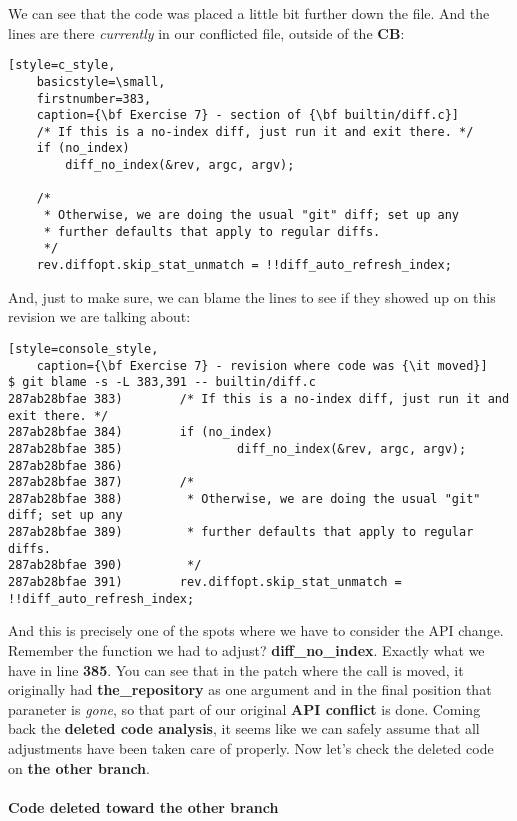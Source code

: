 We can see that the code was placed a little bit further down the file. And the lines are there {\it currently}
in our conflicted file, outside of the {\bf CB}:

\begin{lstlisting}[style=c_style,
	basicstyle=\small,
	firstnumber=383,
	caption={\bf Exercise 7} - section of {\bf builtin/diff.c}]
	/* If this is a no-index diff, just run it and exit there. */
	if (no_index)
		diff_no_index(&rev, argc, argv);

	/*
	 * Otherwise, we are doing the usual "git" diff; set up any
	 * further defaults that apply to regular diffs.
	 */
	rev.diffopt.skip_stat_unmatch = !!diff_auto_refresh_index;
\end{lstlisting}

And, just to make sure, we can blame the lines to see if they showed up on this revision we are talking about:

\begin{lstlisting}[style=console_style,
	caption={\bf Exercise 7} - revision where code was {\it moved}]
$ git blame -s -L 383,391 -- builtin/diff.c
287ab28bfae 383)        /* If this is a no-index diff, just run it and exit there. */
287ab28bfae 384)        if (no_index)
287ab28bfae 385)                diff_no_index(&rev, argc, argv);
287ab28bfae 386) 
287ab28bfae 387)        /*
287ab28bfae 388)         * Otherwise, we are doing the usual "git" diff; set up any
287ab28bfae 389)         * further defaults that apply to regular diffs.
287ab28bfae 390)         */
287ab28bfae 391)        rev.diffopt.skip_stat_unmatch = !!diff_auto_refresh_index;
\end{lstlisting}

And this is precisely one of the spots where we have to consider the API change. Remember the function
we had to adjust? {\bf diff\_no\_index}. Exactly what we have in line {\bf 385}. You can see that in the patch where the
call is moved, it originally had {\bf the\_repository} as one argument and in the final position that paraneter is {\it gone},
so that part of our original {\bf API conflict} is done. Coming back the {\bf deleted code analysis}, it seems like we
can safely assume that all adjustments have been taken care of properly. Now let's check the deleted code on {\bf the other
branch}.

\paragraph{Code deleted toward the other branch}

